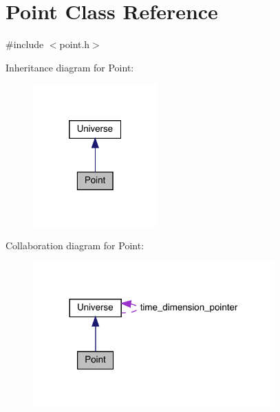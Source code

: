 \hypertarget{class_point}{}\section{Point Class Reference}
\label{class_point}


{\ttfamily \#include $<$point.\+h$>$}



Inheritance diagram for Point\+:\nopagebreak
\begin{figure}[H]
\begin{center}
\leavevmode
\includegraphics[width=136pt]{class_point__inherit__graph}
\end{center}
\end{figure}


Collaboration diagram for Point\+:\nopagebreak
\begin{figure}[H]
\begin{center}
\leavevmode
\includegraphics[width=263pt]{class_point__coll__graph}
\end{center}
\end{figure}
